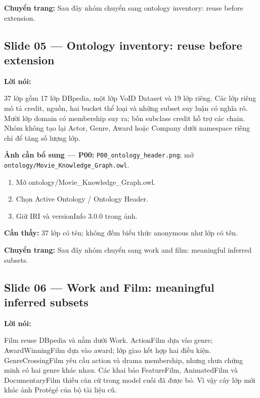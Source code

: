 \documentclass[
  11pt,
]{article}
\providecommand{\tightlist}{%
  \setlength{\itemsep}{0pt}\setlength{\parskip}{0pt}}
\begin{document}
\textbf{Chuyển trang:} Sau đây nhóm chuyển sang ontology inventory:
reuse before extension.

\subsection{Slide 05 --- Ontology inventory: reuse before
extension}\label{slide-05-ontology-inventory-reuse-before-extension}

\textbf{Lời nói:}

37 lớp gồm 17 lớp DBpedia, một lớp VoID Dataset và 19 lớp riêng. Các lớp
riêng mô tả credit, nguồn, hai bucket thể loại và những subset suy luận
có nghĩa rõ. Mười lớp domain có membership suy ra; bốn subclass credit
hỗ trợ các chain. Nhóm không tạo lại Actor, Genre, Award hoặc Company
dưới namespace riêng chỉ để tăng số lượng lớp.

\textbf{Ảnh cần bổ sung --- P00:}
\texttt{P00\_\allowbreak{}onto\allowbreak{}logy\_\allowbreak{}hea\allowbreak{}der.\allowbreak{}png};
mở
\texttt{ontology\allowbreak{}/\allowbreak{}\allowbreak{}Movie\_\allowbreak{}\allowbreak{}K\allowbreak{}nowledge\allowbreak{}\_\allowbreak{}\allowbreak{}Graph.\allowbreak{}o\allowbreak{}wl}.

\begin{enumerate}
\def\labelenumi{\arabic{enumi}.}
\tightlist
\item
  Mở
  ontology\allowbreak{}/\allowbreak{}\allowbreak{}Movie\_\allowbreak{}\allowbreak{}K\allowbreak{}nowledge\allowbreak{}\_\allowbreak{}\allowbreak{}Graph.\allowbreak{}o\allowbreak{}wl.\allowbreak{}
\item
  Chọn Active Ontology / Ontology Header.
\item
  Giữ IRI và versionInfo 3.0.0 trong ảnh.
\end{enumerate}

\textbf{Cần thấy:} 37 lớp có tên; không đếm biểu thức anonymous như lớp
có tên.

\textbf{Chuyển trang:} Sau đây nhóm chuyển sang work and film:
meaningful inferred subsets.

\subsection{Slide 06 --- Work and Film: meaningful inferred
subsets}\label{slide-06-work-and-film-meaningful-inferred-subsets}

\textbf{Lời nói:}

Film reuse DBpedia và nằm dưới Work. ActionFilm dựa vào genre;
Award\allowbreak{}Win\allowbreak{}ning\allowbreak{}Film\allowbreak{} dựa
vào award; lớp giao kết hợp hai điều kiện.
Genre\allowbreak{}Cro\allowbreak{}ssing\allowbreak{}Fil\allowbreak{}m
yêu cầu action và drama membership, nhưng chưa chứng minh có hai genre
khác nhau. Các khai báo FeatureFilm, AnimatedFilm và
Document\allowbreak{}ary\allowbreak{}Film thiếu căn cứ trong model cuối
đã được bỏ. Vì vậy cây lớp mới khác ảnh Protégé của bộ tài liệu cũ.
\end{document}
